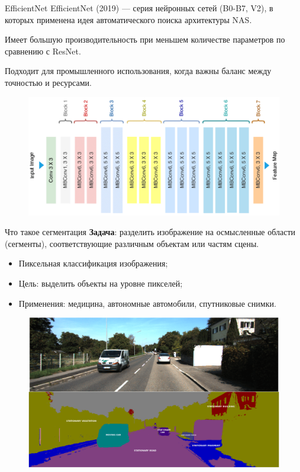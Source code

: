 \documentclass[notheorems, handout]{beamer}
\begin{document}
\begin{frame}{EfficientNet}
    EfficientNet (2019) --- серия нейронных сетей (B0-B7, V2), в которых применена идея автоматического поиска архитектуры NAS.

    Имеет большую производительность при меньшем количестве параметров по сравнению с ResNet.

    Подходит для промышленного использования, когда важны баланс между точностью и ресурсами.

    \begin{figure}
        \includegraphics[width=0.8\linewidth]{img/efficientnet.png}    
    \end{figure}
\end{frame}

\begin{frame}{Что такое сегментация}
    \textbf{Задача}: разделить изображение на осмысленные области (сегменты), соответствующие различным объектам или частям сцены.

    \begin{itemize}
        \item Пиксельная классификация изображения;
        \item Цель: выделить объекты на уровне пикселей;
        \item Применения: медицина, автономные автомобили, спутниковые снимки.
    \end{itemize}
    \begin{figure}
        \includegraphics[width=0.8\linewidth]{img/segmentation.png}
    \end{figure}
\end{frame}
\end{document}
